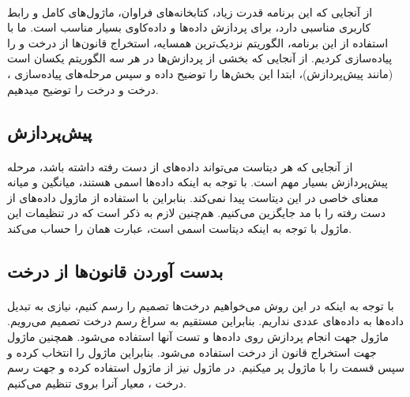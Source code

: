 \documentclass[a4paper,12pt]{article}
\begin{document}
\paragraph{}
از آنجایی که این برنامه قدرت زیاد، کتابخانه‌های فراوان، ماژول‌های کامل و رابط کاربری مناسبی دارد، برای پردازش داده‌ها و داده‌کاوی بسیار مناسب است. ما با استفاده از این برنامه، الگوریتم  نزدیک‌ترین همسایه، استخراج قانون‌ها از درخت  و  را پیاده‌سازی کردیم.
از آنجایی که بخشی از پردازش‌ها در هر سه الگوریتم یکسان است (مانند پیش‌پردازش)، ابتدا این بخش‌ها را توضیح داده و سپس مرحله‌های پیاده‌سازی ، درخت  و درخت  را توضیح میدهیم.

\subsection{پیش‌پردازش}
\paragraph{}
از آنجایی که هر دیتاست می‌تواند داده‌های از دست رفته داشته باشد، مرحله پیش‌پردازش بسیار مهم است. با توجه به اینکه داده‌ها اسمی هستند، میانگین و میانه معنای خاصی در این دیتاست پیدا نمی‌کند. بنابراین با استفاده از ماژول  داده‌های از دست رفته را با مد جایگزین می‌کنیم. هم‌چنین لازم به ذکر است که در تنظیمات این ماژول با توجه به اینکه دیتاست اسمی است، عبارت  همان  را حساب می‌کند.

\subsection{بدست آوردن قانون‌ها از درخت }
\paragraph{}
با توجه به اینکه در این روش می‌خواهیم درخت‌ها تصمیم را رسم کنیم، نیازی به تبدیل داده‌ها به داده‌های عددی نداریم. بنابراین مستقیم به سراغ رسم درخت تصمیم می‌رویم. ماژول  جهت انجام پردازش روی داده‌ها و تست آنها استفاده می‌شود. همچنین ماژول  جهت استخراج قانون از درخت استفاده می‌شود. بنابراین ماژول  را انتخاب کرده و سپس قسمت  را با ماژول  پر میکنیم. در ماژول   نیز از ماژول  استفاده کرده و جهت رسم درخت ، معیار آنرا بروی  تنظیم می‌کنیم.
\end{document}
